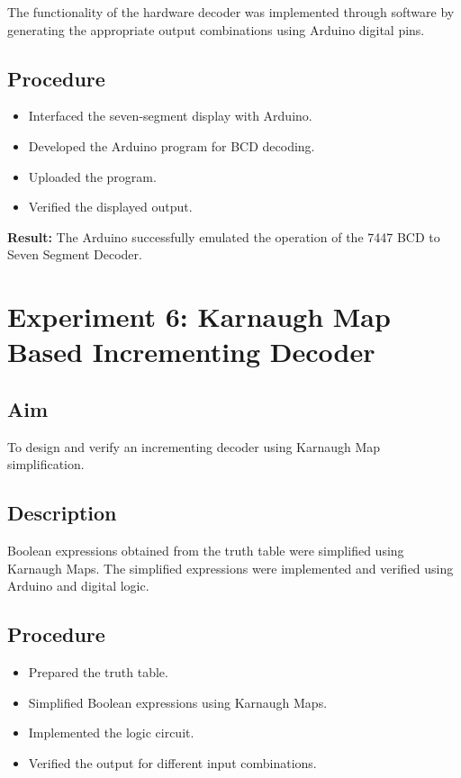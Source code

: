 \documentclass[12pt,a4paper]{report}
\begin{document}
The functionality of the hardware decoder was implemented through software by generating the appropriate output combinations using Arduino digital pins.

\subsection*{Procedure}

\begin{itemize}
    \item Interfaced the seven-segment display with Arduino.
    \item Developed the Arduino program for BCD decoding.
    \item Uploaded the program.
    \item Verified the displayed output.
\end{itemize}

\textbf{Result:} The Arduino successfully emulated the operation of the 7447 BCD to Seven Segment Decoder.

\section{Experiment 6: Karnaugh Map Based Incrementing Decoder}

\subsection*{Aim}

To design and verify an incrementing decoder using Karnaugh Map simplification.

\subsection*{Description}

Boolean expressions obtained from the truth table were simplified using Karnaugh Maps. The simplified expressions were implemented and verified using Arduino and digital logic.

\subsection*{Procedure}

\begin{itemize}
    \item Prepared the truth table.
    \item Simplified Boolean expressions using Karnaugh Maps.
    \item Implemented the logic circuit.
    \item Verified the output for different input combinations.
\end{itemize}
\end{document}
